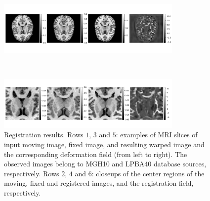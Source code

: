 \documentclass[preprint,authoryear]{elsarticle}
\begin{document}
\begin{figure}
\begin{minipage}[b]{0.9\linewidth}
			\includegraphics[width=9cm]{Reg_results_2_69.png}
	\end{minipage} \\
	\begin{minipage}[b]{0.9\linewidth}
		\centering
			\includegraphics[width=9cm]{Reg_results_2_69_closeups.png}
	\end{minipage}
	\caption{Registration results. Rows $1$, $3$ and $5$: examples of MRI slices of input moving image, fixed image, and resulting warped image and the corresponding deformation field (from left to right). The observed images belong to MGH10 and LPBA40 database sources, respectively. Rows $2$, $4$ and $6$: closeups of the center regions of the moving, fixed and registered images, and the registration field, respectively.   }\label{fig:RegMRIexample}	
\end{figure} 
\begin{table}[ht]
\centering
{}
\caption{Percentages of folds and Dice score for different values of $\lambda$. The mean and std values of percentage of folds and Dice score, calculated over the whole test set, for the deformation fields obtained by NPBDREG with three values of $\lambda$, $\lambda=\{0.005,0.01,0.1\}$ and the baseline PrVXM. The number of folds i.e. voxels with negative determinant of the Jacobian, $|J_\Phi|<0$, is computed. Then, the percentage of folds for each volume is calculated by dividing the total number of folds by the overall number of voxels. The best Dice score and minimal number of folds are obtained by the model with $\lambda=0.1$. }\label{tab:tuninglambda}
\end{table}
\end{document}
